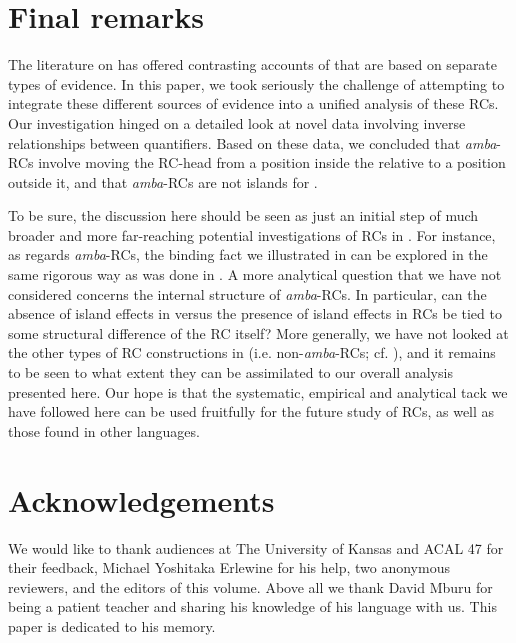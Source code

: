 \documentclass[output=paper,modfonts,nonflat,
colorlinks, citecolor=brown,
]{langsci/langscibook}
\begin{document}
\section{Final remarks}\label{sec:gould:6}

The literature on  has offered contrasting accounts of  that are based on separate types of evidence. In this paper, we took seriously the challenge of attempting to integrate these different sources of evidence into a unified analysis of these RCs. Our investigation hinged on a detailed look at novel data involving inverse  relationships between quantifiers. Based on these data, we concluded that \textit{amba}{}-RCs involve moving the RC-head from a position inside the relative to a position outside it, and that \textit{amba}{}-RCs are not islands for . 

To be sure, the discussion here should be seen as just an initial step of much broader and more far-reaching potential investigations of RCs in . For instance, as regards \textit{amba}{}-RCs, the binding fact we illustrated in  can be explored in the same rigorous way as was done in . A more analytical question that we have not considered concerns the internal structure of \textit{amba}{}-RCs. In particular, can the absence of island effects in  versus the presence of island effects in  RCs be tied to some structural difference of the RC itself? More generally, we have not looked at the other types of RC constructions in  (i.e. non-\textit{amba}{}-RCs; cf. \citealt{Ngonyani2001}), and it remains to be seen to what extent they can be assimilated to our overall analysis presented here. Our hope is that the systematic, empirical and analytical tack we have followed here can be used fruitfully for the future study of  RCs, as well as those found in other languages.

\section*{Acknowledgements}
We would like to thank audiences at The University of Kansas and ACAL 47 for their feedback, Michael Yoshitaka Erlewine for his help, two anonymous reviewers, and the editors of this volume. Above all we thank David Mburu for being a patient teacher and sharing his knowledge of his language with us. This paper is dedicated to his memory.
\end{document}
